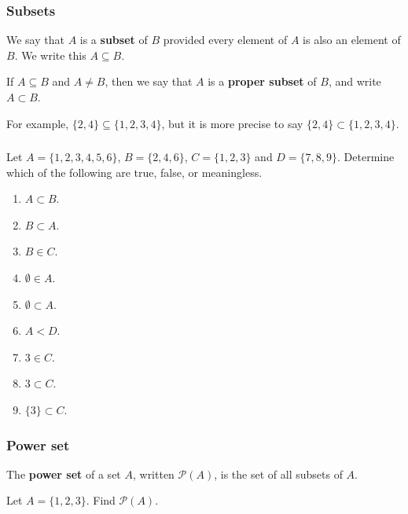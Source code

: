 \documentclass[11pt, compress]{beamer}
\newcommand{\terminology}[1]{\textbf{#1}}\newcommand{\lt}{<}
\newcommand{\pow}{\mathcal P}
\begin{document}
\begin{frame}
\frametitle{Subsets}
 We say that \(A\) is a \terminology{subset} of \(B\) provided every element of \(A\) is also an element of \(B\).  We write this \(A \subseteq B\).
 
\pause \vfill 

If \(A \subseteq B\) and \(A \ne B\), then we say that \(A\) is a \terminology{proper subset} of \(B\), and write \(A \subset B\).
 
\pause \vfill 

For example, \(\{2,4\} \subseteq \{1,2,3,4\}\), but it is more precise to say \(\{2,4\} \subset \{1,2,3,4\}\).
\end{frame}
 
\begin{frame}
\frametitle{}
\begin{example}[0.3.3]Let \(A = \{1, 2, 3, 4, 5, 6\}\), \(B = \{2, 4, 6\}\), \(C = \{1, 2, 3\}\) and \(D = \{7, 8, 9\}\). Determine which of the following are true, false, or meaningless.
\begin{enumerate}
\item{} \(A \subset B\).

\item{} \(B \subset A\).

\item{} \(B \in C\).

\item{} \(\emptyset \in A\).

\item{} \(\emptyset \subset A\).

\item{} \(A \lt D\).

\item{} \(3 \in C\).

\item{} \(3 \subset C\).

\item{} \(\{3\} \subset C\).
\end{enumerate}

\end{example}
\end{frame}
 
\begin{frame}
\frametitle{Power set}
 The \terminology{power set} of a set \(A\), written \(\pow(A)\), is the set of all subsets of \(A\).
 \begin{example}[0.3.4]Let \(A = \{1,2,3\}\). Find \(\pow(A)\).
\end{example}
\end{frame}
 
\end{document}
